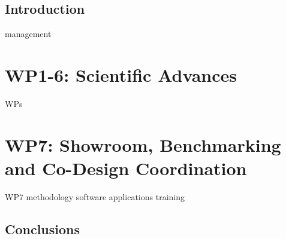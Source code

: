 \documentclass[11pt]{report}
\begin{document}

\makecover%


\clearpage
{}
\settableofcontents%
\tableofcontents


\clearpage
\setlistoffigures%
\listoffigures


\clearpage
\setlistoftables%
\listoftables





\chapter{Introduction}
\label{chap:introduction}


{management}
\part{WP1-6: Scientific Advances}
{WPs}
\part{WP7: Showroom, Benchmarking and Co-Design Coordination}
{WP7}
{methodology}
{software}
{applications}
{training}

\chapter{Conclusions}
\label{chap:conclusions}



\clearpage




\appendix





\PrintTodoList
\makedisclaimer%
\end{document}
